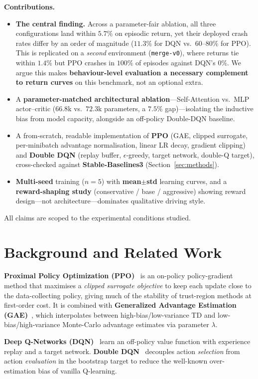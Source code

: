 \documentclass[conference]{IEEEtran}
\newcommand{\code}[1]{\texttt{#1}}
\begin{document}
\textbf{Contributions.}
\begin{itemize}
\item \textbf{The central finding.} Across a parameter-fair ablation, all three
configurations land within $5.7\%$ on episodic return, yet their deployed crash
rates differ by an order of magnitude ($11.3\%$ for DQN vs.\ $60$--$80\%$ for
PPO). This is replicated on a \emph{second} environment (\code{merge-v0}), where
returns tie within $1.4\%$ but PPO crashes in $100\%$ of episodes against DQN's
$0\%$. We argue this makes \textbf{behaviour-level evaluation a necessary
complement to return curves} on this benchmark, not an optional extra.
\item A \textbf{parameter-matched architectural ablation}---Self-Attention
vs.\ MLP actor--critic ($66.8$k vs.\ $72.3$k parameters, a $7.5\%$ gap)---isolating
the inductive bias from model capacity, alongside an off-policy Double-DQN
baseline.
\item A from-scratch, readable implementation of \textbf{PPO} (GAE, clipped
surrogate, per-minibatch advantage normalisation, linear LR decay, gradient
clipping) and \textbf{Double DQN} (replay buffer, $\epsilon$-greedy, target
network, double-Q target), cross-checked against \textbf{Stable-Baselines3}
(Section~\ref{sec:methods}).
\item \textbf{Multi-seed} training ($n=5$) with \textbf{mean$\pm$std} learning
curves, and a \textbf{reward-shaping study} (conservative / base / aggressive)
showing reward design---not architecture---dominates qualitative driving style.
\end{itemize}

All claims are scoped to the experimental conditions studied.

\section{Background and Related Work}
\textbf{Proximal Policy Optimization (PPO)}~\cite{schulman2017proximal} is an
on-policy policy-gradient method that maximises a \emph{clipped surrogate
objective} to keep each update close to the data-collecting policy, giving much
of the stability of trust-region methods at first-order cost. It is combined
with \textbf{Generalized Advantage Estimation (GAE)}~\cite{schulman2015high},
which interpolates between high-bias/low-variance TD and low-bias/high-variance
Monte-Carlo advantage estimates via parameter $\lambda$.

\textbf{Deep Q-Networks (DQN)}~\cite{mnih2015human} learn an off-policy value
function with experience replay and a target network. \textbf{Double
DQN}~\cite{van2016deep} decouples action \emph{selection} from action
\emph{evaluation} in the bootstrap target to reduce the well-known
over-estimation bias of vanilla Q-learning.
\end{document}
